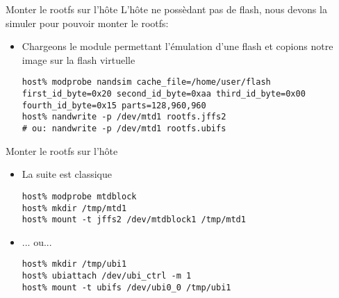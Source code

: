\begin{frame}[fragile=singleslide]{Monter le rootfs sur l'hôte}
  L'hôte  ne possèdant  pas  de  flash, nous  devons  la simuler  pour
  pouvoir monter le rootfs:
  \begin{itemize}
  \item  Chargeons le  module  permettant l'émulation  d'une flash  et
    copions notre image sur la flash virtuelle
    \begin{lstlisting}
host% modprobe nandsim cache_file=/home/user/flash first_id_byte=0x20 second_id_byte=0xaa third_id_byte=0x00 fourth_id_byte=0x15 parts=128,960,960
host% nandwrite -p /dev/mtd1 rootfs.jffs2
# ou: nandwrite -p /dev/mtd1 rootfs.ubifs
     \end{lstlisting}
  \end{itemize}
\end{frame}

\begin{frame}[fragile=singleslide]{Monter le rootfs sur l'hôte}
  \begin{itemize}
\item La suite est classique
    \begin{lstlisting}
host% modprobe mtdblock
host% mkdir /tmp/mtd1
host% mount -t jffs2 /dev/mtdblock1 /tmp/mtd1
     \end{lstlisting}
     \item ... ou...
    \begin{lstlisting}
host% mkdir /tmp/ubi1
host% ubiattach /dev/ubi_ctrl -m 1
host% mount -t ubifs /dev/ubi0_0 /tmp/ubi1
     \end{lstlisting}
  \end{itemize}
\end{frame}

